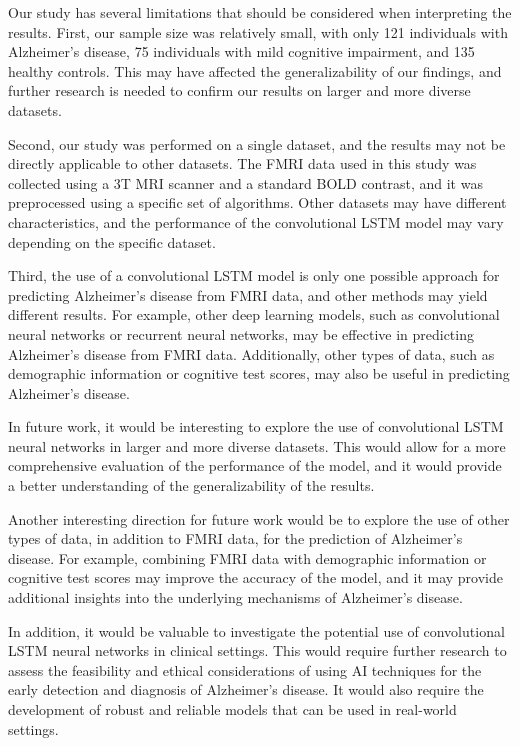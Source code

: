 \documentclass[10pt]{article}
\begin{document}
	Our study has several limitations that should be considered when interpreting the results. First, our sample size was relatively small, with only 121 individuals with Alzheimer's disease, 75 individuals with mild cognitive impairment, and 135 healthy controls. This may have affected the generalizability of our findings, and further research is needed to confirm our results on larger and more diverse datasets.

	Second, our study was performed on a single dataset, and the results may not be directly applicable to other datasets. The FMRI data used in this study was collected using a 3T MRI scanner and a standard BOLD contrast, and it was preprocessed using a specific set of algorithms. Other datasets may have different characteristics, and the performance of the convolutional LSTM model may vary depending on the specific dataset.

	Third, the use of a convolutional LSTM model is only one possible approach for predicting Alzheimer's disease from FMRI data, and other methods may yield different results. For example, other deep learning models, such as convolutional neural networks or recurrent neural networks, may be effective in predicting Alzheimer's disease from FMRI data. Additionally, other types of data, such as demographic information or cognitive test scores, may also be useful in predicting Alzheimer's disease.

	In future work, it would be interesting to explore the use of convolutional LSTM neural networks in larger and more diverse datasets. This would allow for a more comprehensive evaluation of the performance of the model, and it would provide a better understanding of the generalizability of the results.

	Another interesting direction for future work would be to explore the use of other types of data, in addition to FMRI data, for the prediction of Alzheimer's disease. For example, combining FMRI data with demographic information or cognitive test scores may improve the accuracy of the model, and it may provide additional insights into the underlying mechanisms of Alzheimer's disease.

	In addition, it would be valuable to investigate the potential use of convolutional LSTM neural networks in clinical settings. This would require further research to assess the feasibility and ethical considerations of using AI techniques for the early detection and diagnosis of Alzheimer's disease. It would also require the development of robust and reliable models that can be used in real-world settings.
\end{document}
